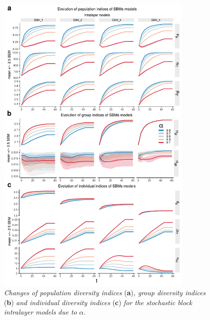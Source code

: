 \begin{figure}[!ht]
    \centering
    \includegraphics[width=0.85\textwidth]{figures/FigS3.pdf}
    \caption{
    \textit{Changes of population diversity indices} (\textbf{a})\textit{, group diversity indices} (\textbf{b}) \textit{and individual diversity indices} (\textbf{c}) \textit{for the stochastic block intralayer models} \textit{due to} $\alpha$.
    }
    \label{supp:3}
\end{figure}